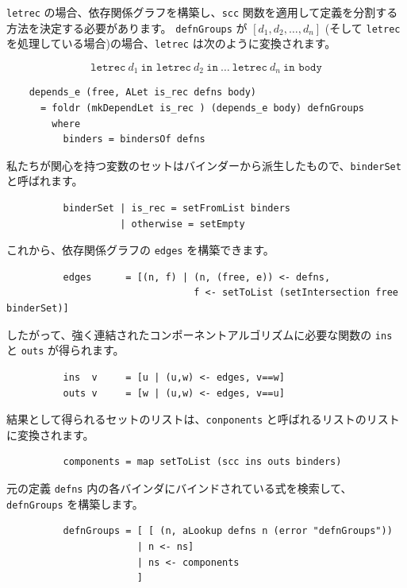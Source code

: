 \documentclass{jbook}
\begin{document}
\texttt{letrec} の場合、依存関係グラフを構築し、\texttt{scc} 関数を適用して定義を分割する方法を決定する必要があります。
\texttt{defnGroups} が $\left[d_1, d_2, \ldots, d_n \right]$ (そして \texttt{letrec} を処理している場合)の場合、\texttt{letrec} は次のように変換されます。

\[\texttt{letrec} ~ d_1 ~ \texttt{in letrec} ~ d_2 ~ \texttt{in} ~ \ldots ~ \texttt{letrec} ~ d_n ~ \texttt{in body}\]

\begin{verbatim}
	depends_e (free, ALet is_rec defns body)
	  = foldr (mkDependLet is_rec ) (depends_e body) defnGroups
	    where
	      binders = bindersOf defns
\end{verbatim}

私たちが関心を持つ変数のセットはバインダーから派生したもので、\texttt{binderSet} と呼ばれます。

\begin{verbatim}
	      binderSet | is_rec = setFromList binders
	                | otherwise = setEmpty
\end{verbatim}

これから、依存関係グラフの \texttt{edges} を構築できます。

\begin{verbatim}
	      edges      = [(n, f) | (n, (free, e)) <- defns,
	                             f <- setToList (setIntersection free binderSet)]
\end{verbatim}

したがって、強く連結されたコンポーネントアルゴリズムに必要な関数の \texttt{ins} と \texttt{outs} が得られます。

\begin{verbatim}
	      ins  v     = [u | (u,w) <- edges, v==w]
	      outs v     = [w | (u,w) <- edges, v==u]
\end{verbatim}

結果として得られるセットのリストは、\texttt{conponents} と呼ばれるリストのリストに変換されます。

\begin{verbatim}
	      components = map setToList (scc ins outs binders)
\end{verbatim}

元の定義 \texttt{defns} 内の各バインダにバインドされている式を検索して、\texttt{defnGroups} を構築します。

\begin{verbatim}
	      defnGroups = [ [ (n, aLookup defns n (error "defnGroups"))
	                   | n <- ns]
	                   | ns <- components
	                   ]
\end{verbatim}
\end{document}
